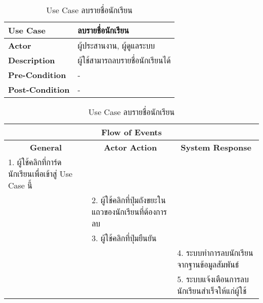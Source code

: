 \begin{table}[H]
    \caption{Use Case ลบรายชื่อนักเรียน}
    \label{tab:use-case-remove-student}
    \begin{tabularx}{\textwidth}{ | p{3cm} | X | }
    \hline
    \textbf{Use Case} & ลบรายชื่อนักเรียน \\
    \hline
    \textbf{Actor} & ผู้ประสานงาน, ผู้ดูแลระบบ \\
    \hline
    \textbf{Description} & ผู้ใช้สามารถลบรายชื่อนักเรียนได้ \\
    \hline
    \textbf{Pre-Condition} & - \\
    \hline
    \textbf{Post-Condition} & - \\
    \hline
    \end{tabularx}
    \begin{tabularx}{\textwidth}{ | X | X | X | }
    \multicolumn{3}{|c|}{\textbf{Flow of Events}} \\
    \hline
    \multicolumn{1}{|c|}{\textbf{General}} & \multicolumn{1}{|c|}{\textbf{Actor Action}} & \multicolumn{1}{|c|}{\textbf{System Response}} \\
    \hline
    1. ผู้ใช้คลิกที่การ์ดนักเรียนเพื่อเข้าสู่ Use Case นี้ & & \\
    \hline
    & 2. ผู้ใช้คลิกที่ปุ่มถังขยะในแถวของนักเรียนที่ต้องการลบ & \\
    \hline
    & 3. ผู้ใช้คลิกที่ปุ่มยืนยัน & \\
    \hline
    & & 4. ระบบทำการลบนักเรียนจากฐานข้อมูลสัมพันธ์ \\
    \hline
    & & 5. ระบบแจ้งเตือนการลบนักเรียนสำเร็จให้แก่ผู้ใช้ \\
    \hline
    \end{tabularx}
\end{table}
